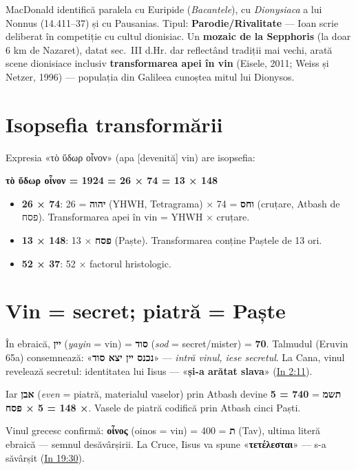 \documentclass[12pt,a4paper,twoside,openany]{book}
\begin{document}
MacDonald identifică paralela cu Euripide (\textit{Bacantele}), cu \textit{Dionysiaca} a lui Nonnus (14.411--37) și cu Pausanias. Tipul: \textbf{Parodie/Rivalitate} — Ioan scrie deliberat în competiție cu cultul dionisiac. Un \textbf{mozaic de la Sepphoris} (la doar 6 km de Nazaret), datat sec.~III d.Hr. dar reflectând tradiții mai vechi, arată scene dionisiace inclusiv \textbf{transformarea apei în vin} (Eisele, 2011; Weiss și Netzer, 1996) — populația din Galileea cunoștea mitul lui Dionysos.

\section{Isopsefia transformării}

Expresia «τὸ ὕδωρ οἶνον» (apa [devenită] vin) are isopsefia:

\begin{center}
\textbf{τὸ ὕδωρ οἶνον = 1924 = 26 × 74 = 13 × 148}
\end{center}

\begin{itemize}
  \item \textbf{26 × 74}: 26 = \textbf{יהוה} (YHWH, Tetragrama) × 74 = \textbf{וחס} (cruțare, Atbash de פסח). Transformarea apei în vin = YHWH × cruțare.
  \item \textbf{13 × 148}: 13 × \textbf{פסח} (Paște). Transformarea conține Paștele de 13 ori.
  \item \textbf{52 × 37}: 52 × factorul hristologic.
\end{itemize}

\section{Vin = secret; piatră = Paște}

În ebraică, \textbf{יין} (\textit{yayin} = vin) = \textbf{סוד} (\textit{sod} = secret/mister) = \textbf{70}. Talmudul (Eruvin 65a) consemnează: «\textbf{נכנס יין יצא סוד}» — \textit{intră vinul, iese secretul}. La Cana, vinul revelează secretul: identitatea lui Iisus — «\textbf{și-a arătat slava}» (\href{https://bibliaortodoxa.ro/carte.php?id=35\&cap=2\#11}{In 2:11}).

Iar \textbf{אבן} (\textit{even} = piatră, materialul vaselor) prin Atbash devine \textbf{תשמ} = \textbf{740 = 5 × 148 = 5 × פסח}. Vasele de piatră codifică prin Atbash cinci Paști.

Vinul grecesc confirmă: \textbf{οἶνος} (oinos = vin) = 400 = \textbf{ת} (Tav), ultima literă ebraică — semnul desăvârșirii. La Cruce, Iisus va spune «\textbf{τετέλεσται}» — s-a săvârșit (\href{https://bibliaortodoxa.ro/carte.php?id=35\&cap=19\#30}{In 19:30}).
\end{document}
